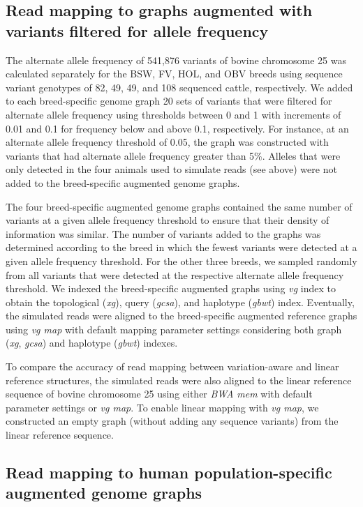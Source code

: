 \documentclass[../main.tex]{subfiles}
\begin{document}
\subsection*{Read mapping to graphs augmented with variants filtered for allele frequency}

The alternate allele frequency of 541,876 variants of bovine chromosome 25 was calculated separately for the BSW, FV, HOL, and OBV breeds using sequence variant genotypes of 82, 49, 49, and 108 sequenced cattle, respectively. We added to each breed-specific genome graph 20 sets of variants that were filtered for alternate allele frequency using thresholds between 0 and 1 with increments of 0.01 and 0.1 for frequency below and above 0.1, respectively. For instance, at an alternate allele frequency threshold of 0.05, the graph was constructed with variants that had alternate allele frequency greater than 5\%. Alleles that were only detected in the four animals used to simulate reads (see above) were not added to the breed-specific augmented genome graphs.

The four breed-specific augmented genome graphs contained the same number of variants at a given allele frequency threshold to ensure that their density of information was similar. The number of variants added to the graphs was determined according to the breed in which the fewest variants were detected at a given allele frequency threshold. For the other three breeds, we sampled randomly from all variants that were detected at the respective alternate allele frequency threshold. We indexed the breed-specific augmented graphs using \emph{vg} index to obtain the topological (\emph{xg}), query (\emph{gcsa}), and haplotype (\emph{gbwt}) index. Eventually, the simulated reads were aligned to the breed-specific augmented reference graphs using \emph{vg map} with default mapping parameter settings considering both graph (\emph{xg}, \emph{gcsa}) and haplotype (\emph{gbwt}) indexes.

To compare the accuracy of read mapping between variation-aware and linear reference structures, the simulated reads were also aligned to the linear reference sequence of bovine chromosome 25 using either \emph{BWA mem} with default parameter settings or \emph{vg map}. To enable linear mapping with \emph{vg map}, we constructed an empty graph (without adding any sequence variants) from the linear reference sequence.

\subsection*{Read mapping to human population-specific augmented genome graphs}
\end{document}
